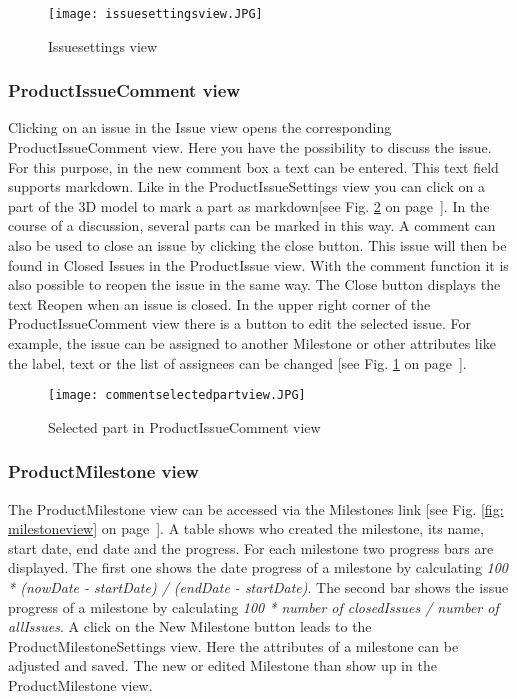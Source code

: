     \begin{figure}[h]
        \centering
        \texttt{[image: issuesettingsview.JPG]}
        \caption{Issuesettings view}
        \label{fig: issuesettingsview}
    \end{figure}

    \subsubsection*{ProductIssueComment view}
    Clicking on an issue in the Issue view opens the corresponding ProductIssueComment view.  Here you have the possibility to discuss the issue. 
    For this purpose, in the new comment box a text can be entered. This text field supports markdown.
    Like in the ProductIssueSettings view you can click on a part of the 3D model to mark a part as markdown[see Fig. \ref{fig: commentselectedpartview} on page~\pageref{fig: commentselectedpartview}]. In the course of a discussion, several parts can be marked in this way.
    A comment can also be used to close an issue by clicking the close button. This issue will then be found in Closed Issues in the ProductIssue view. With the comment function it is also possible to reopen the issue in the same way. The Close button displays the text Reopen when an issue is closed. In the upper right corner of the ProductIssueComment view there is a button to edit the selected issue. For example, the issue can be assigned to another Milestone or other attributes like the label, text or the list of assignees can be changed [see Fig. \ref{fig: issuesettingsview} on page~\pageref{fig: issuesettingsview}].

    \begin{figure}[h]
        \centering
        \texttt{[image: commentselectedpartview.JPG]}
        \caption{Selected part in ProductIssueComment view}
        \label{fig: commentselectedpartview}
    \end{figure}

    \subsubsection*{ProductMilestone view}
    The ProductMilestone view can be accessed via the Milestones link [see Fig. \ref{fig: milestoneview} on page~\pageref{fig: milestoneview}]. A table shows who created the milestone, its name, start date, end date and the progress. For each milestone two progress bars are displayed. The first one shows the date progress of a milestone by calculating \textit{100 * (nowDate - startDate) / (endDate - startDate)}. The second bar shows the issue progress of a milestone by calculating \textit{100 * number of closedIssues / number of allIssues}.
    A click on the New Milestone button leads to the ProductMilestoneSettings view. Here the attributes of a milestone can be adjusted and saved. The new or edited Milestone than show up in the ProductMilestone view.

